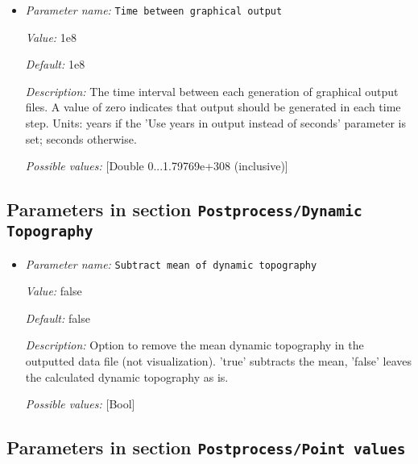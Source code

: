 \begin{itemize}
{\it Possible values:} [Selection none|dx|ucd|gnuplot|povray|eps|gmv|tecplot|tecplot_binary|vtk|vtu|hdf5|svg|deal.II intermediate|txt ]
\item {\it Parameter name:} {\tt Time between graphical output}
\label{parameters:Postprocess/Depth average/Time between graphical output}


{\it Value:} 1e8


{\it Default:} 1e8


{\it Description:} The time interval between each generation of graphical output files. A value of zero indicates that output should be generated in each time step. Units: years if the 'Use years in output instead of seconds' parameter is set; seconds otherwise.


{\it Possible values:} [Double 0...1.79769e+308 (inclusive)]
\end{itemize}

\subsection{Parameters in section \tt Postprocess/Dynamic Topography}
\label{parameters:Postprocess/Dynamic_20Topography}

\begin{itemize}
\item {\it Parameter name:} {\tt Subtract mean of dynamic topography}
\label{parameters:Postprocess/Dynamic Topography/Subtract mean of dynamic topography}


{\it Value:} false


{\it Default:} false


{\it Description:} Option to remove the mean dynamic topography in the outputted data file (not visualization). 'true' subtracts the mean, 'false' leaves the calculated dynamic topography as is. 


{\it Possible values:} [Bool]
\end{itemize}

\subsection{Parameters in section \tt Postprocess/Point values}
\label{parameters:Postprocess/Point_20values}

